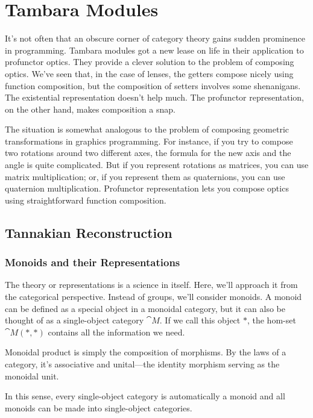 \documentclass[DaoFP]{subfiles}
\begin{document}
\setcounter{chapter}{17}

\chapter{Tambara Modules}

It's not often that an obscure corner of category theory gains sudden prominence in programming. Tambara modules got a new lease on life in their application to profunctor optics. They provide a clever solution to the problem of composing optics. We've seen that, in the case of lenses, the getters compose nicely using function composition, but the composition of setters involves some shenanigans. The existential representation doesn't help much. The profunctor representation, on the other hand, makes composition a snap. 

The situation is somewhat analogous to the problem of composing geometric transformations in graphics programming. For instance, if you try to compose two rotations around two different axes, the formula for the new axis and the angle is quite complicated. But if you represent rotations as matrices, you can use matrix multiplication; or, if you represent them as quaternions, you can use quaternion multiplication. Profunctor representation lets you compose optics using straightforward function composition.

\section{Tannakian Reconstruction}

\subsection{Monoids and their Representations}

The theory or representations is a science in itself. Here, we'll approach it from the categorical perspective. Instead of groups, we'll consider monoids. A monoid can be defined as a special object in a monoidal category, but it can also be thought of as a single-object category $\cat M$. If we call this object $*$, the hom-set $\cat M( *, *)$ contains all the information we need. 

Monoidal product is simply the composition of morphisms. By the laws of a category, it's associative and unital---the identity morphism serving as the monoidal unit.

In this sense, every single-object category is automatically a monoid and all monoids can be made into single-object categories. 
\end{document}
